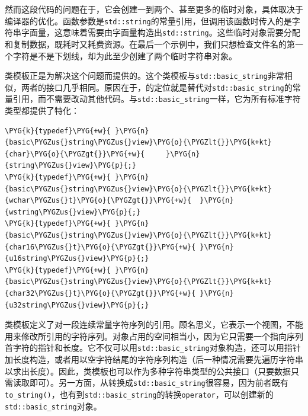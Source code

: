 
然而这段代码的问题在于，它会创建一到两个、甚至更多的临时对象，具体取决于编译器的优化。函数参数是\texttt{std::\allowbreak{}string}的常量引用，但调用该函数时传入的是字符串字面量，这意味着需要由字面量构造出\texttt{std::\allowbreak{}string}。这些临时对象需要分配和复制数据，既耗时又耗费资源。在最后一个示例中，我们只想检查文件名的第一个字符是不是下划线，却为此至少创建了两个临时字符串对象。



类模板正是为解决这个问题而提供的。这个类模板与\texttt{std::\allowbreak{}basic\_\allowbreak{}string}非常相似，两者的接口几乎相同。原因在于，的定位就是替代对\texttt{std::\allowbreak{}basic\_\allowbreak{}string}的常量引用，而不需要改动其他代码。与\texttt{std::\allowbreak{}basic\_\allowbreak{}string}一样，它为所有标准字符类型都提供了特化：



\begin{codeblockbg}
\begin{Verbatim}[commandchars=\\\{\},breaklines=true,breakanywhere=true,fontsize=\codefont,xleftmargin=17bp]
\PYG{k}{typedef}\PYG{+w}{ }\PYG{n}{basic\PYGZus{}string\PYGZus{}view}\PYG{o}{\PYGZlt{}}\PYG{k+kt}{char}\PYG{o}{\PYGZgt{}}\PYG{+w}{     }\PYG{n}{string\PYGZus{}view}\PYG{p}{;}
\PYG{k}{typedef}\PYG{+w}{ }\PYG{n}{basic\PYGZus{}string\PYGZus{}view}\PYG{o}{\PYGZlt{}}\PYG{k+kt}{wchar\PYGZus{}t}\PYG{o}{\PYGZgt{}}\PYG{+w}{  }\PYG{n}{wstring\PYGZus{}view}\PYG{p}{;}
\PYG{k}{typedef}\PYG{+w}{ }\PYG{n}{basic\PYGZus{}string\PYGZus{}view}\PYG{o}{\PYGZlt{}}\PYG{k+kt}{char16\PYGZus{}t}\PYG{o}{\PYGZgt{}}\PYG{+w}{ }\PYG{n}{u16string\PYGZus{}view}\PYG{p}{;}
\PYG{k}{typedef}\PYG{+w}{ }\PYG{n}{basic\PYGZus{}string\PYGZus{}view}\PYG{o}{\PYGZlt{}}\PYG{k+kt}{char32\PYGZus{}t}\PYG{o}{\PYGZgt{}}\PYG{+w}{ }\PYG{n}{u32string\PYGZus{}view}\PYG{p}{;}
\end{Verbatim}
\end{codeblockbg}



类模板定义了对一段连续常量字符序列的引用。顾名思义，它表示一个视图，不能用来修改所引用的字符序列。对象占用的空间相当小，因为它只需要一个指向序列首字符的指针和长度。它不仅可以用\texttt{std::\allowbreak{}basic\_\allowbreak{}string}对象构造，还可以用指针加长度构造，或者用以空字符结尾的字符序列构造（后一种情况需要先遍历字符串以求出长度）。因此，类模板也可以作为多种字符串类型的公共接口（只要数据只需读取即可）。另一方面，从转换成\texttt{std::\allowbreak{}basic\_\allowbreak{}string}很容易，因为前者既有\texttt{to\_\allowbreak{}string()}，也有到\texttt{std::\allowbreak{}basic\_\allowbreak{}string}的转换\texttt{operator}，可以创建新的\texttt{std::\allowbreak{}basic\_\allowbreak{}string}对象。


